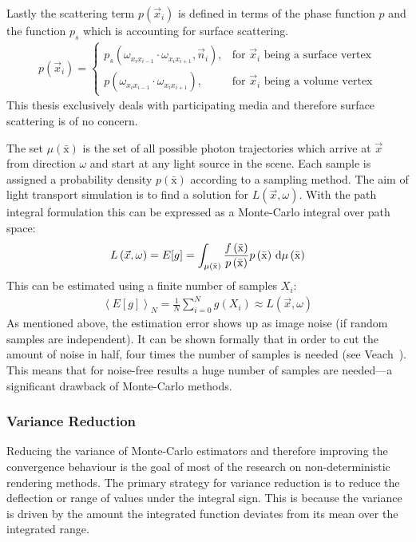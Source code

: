 Lastly the scattering term $p(\vec{x}_i)$ is defined in terms of the phase function $p$ and the function $p_s$ which is accounting for surface scattering.
\begin{align}
p\left(\vec{x}_i\right) =
\begin{cases}
p_s\left(\omega_{x_ix_{i-1}}\cdot\omega_{x_ix_{i+1}}, \vec{n}_i\right), & \text{for $\vec{x}_i$ being a surface vertex}
\\
p\left(\omega_{x_ix_{i-1}}\cdot\omega_{x_ix_{i+1}}\right), & \text{for $\vec{x}_i$ being a volume vertex}
\end{cases}
\end{align}
This thesis exclusively deals with participating media and therefore surface scattering is of no concern.

The set $\mu\left(\bar{\mathrm{x}}\right)$ is the set of all possible photon trajectories which arrive at $\vec{x}$ from direction $\omega$ and start at any light source in the scene. Each sample is assigned a probability density $p\left(\bar{\mathrm{x}}\right)$ according to a sampling method. The aim of light transport simulation is to find a solution for $L(\vec{x}, \omega)$. With the path integral formulation this can be expressed as a Monte-Carlo integral over path space:
\begin{align}
L\left(\vec{x},\omega\right) = E[g] = \int_{\mu\left(\bar{\mathrm{x}}\right)} \frac{f\left(\bar{\mathrm{x}}\right)}{p\left(\bar{\mathrm{x}}\right)}p\left(\bar{\mathrm{x}}\right)
\,\mathrm{d}\mu\left(\bar{\mathrm{x}}\right)
\end{align}
This can be estimated using a finite number of samples $X_i$:
\begin{align}
\left<E[g]\right>_N = 
\frac{1}{N}\sum_{i=0}^{N}
g\left(X_i\right)
\approx
L\left(\vec{x},\omega\right)
\end{align}
As mentioned above, the estimation error shows up as image noise (if random samples are independent). It can be shown formally that in order to cut the amount of noise in half, four times the number of samples is needed (see Veach~\cite{VeachThesis97}). This means that for noise-free results a huge number of samples are needed---a significant drawback of Monte-Carlo methods.

\subsubsection*{Variance Reduction}

Reducing the variance of Monte-Carlo estimators and therefore improving the convergence behaviour is the goal of most of the research on non-deterministic rendering methods. The primary strategy for variance reduction is to reduce the deflection or range of values under the integral sign. This is because the variance is driven by the amount the integrated function deviates from its mean over the integrated range.


